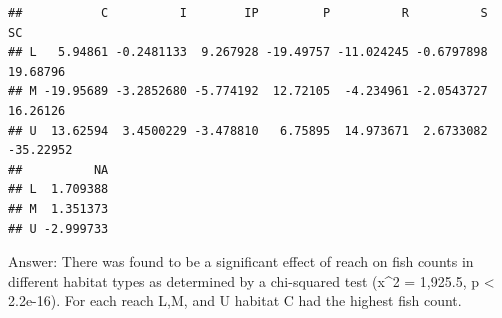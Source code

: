 \documentclass[
]{article}
\newenvironment{Shaded}{\begin{snugshade}}{\end{snugshade}}
\newcommand{\CommentTok}[1]{\textcolor[rgb]{0.56,0.35,0.01}{\textit{#1}}}
\newcommand{\NormalTok}[1]{#1}
\newcommand{\SpecialCharTok}[1]{\textcolor[rgb]{0.81,0.36,0.00}{\textbf{#1}}}
\begin{document}
\begin{Shaded}
\end{Shaded}

\begin{verbatim}
##           C          I        IP         P          R          S        SC
## L   5.94861 -0.2481133  9.267928 -19.49757 -11.024245 -0.6797898  19.68796
## M -19.95689 -3.2852680 -5.774192  12.72105  -4.234961 -2.0543727  16.26126
## U  13.62594  3.4500229 -3.478810   6.75895  14.973671  2.6733082 -35.22952
##          NA
## L  1.709388
## M  1.351373
## U -2.999733
\end{verbatim}

Answer: There was found to be a significant effect of reach on fish
counts in different habitat types as determined by a chi-squared test
(x\^{}2 = 1,925.5, p \textless{} 2.2e-16). For each reach L,M, and U
habitat C had the highest fish count.
\end{document}
